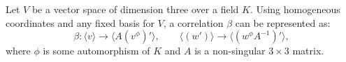 Let $V$ be a vector space of dimension three over a field $K$. Using homogeneous coordinates and any fixed basis for $V$, a correlation $\beta$ can be represented as:
$$\beta: \langle v \rangle \to \langle A(v^\phi)' \rangle, \qquad \langle (w') \rangle \to \langle (w^\phi A^{-1})' \rangle,$$
where $\phi$ is some automorphism of $K$ and $A$ is a non-singular $3 \times 3$ matrix.
